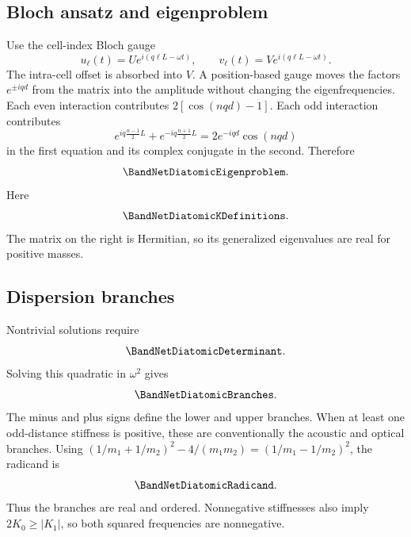 \subsection{Bloch ansatz and eigenproblem}

Use the cell-index Bloch gauge
\begin{equation}
    u_\ell(t)=Ue^{i(q\ell L-\omega t)},\qquad
    v_\ell(t)=Ve^{i(q\ell L-\omega t)}.
    \label{eq:bloch}
\end{equation}
The intra-cell offset is absorbed into $V$. A position-based gauge moves the
factors $e^{\pm iqd}$ from the matrix into the amplitude without changing the
eigenfrequencies. Each even interaction contributes
$2[\cos(nqd)-1]$. Each odd interaction contributes
\begin{equation*}
    e^{iq\frac{n-1}{2}L}+e^{-iq\frac{n+1}{2}L}
    =2e^{-iqd}\cos(nqd)
\end{equation*}
in the first equation and its complex conjugate in the second. Therefore
\begin{equation}
    \BandNetDiatomicEigenproblem.
    \label{eq:eigen}
\end{equation}
Here
\begin{equation}
    \BandNetDiatomicKDefinitions.
    \label{eq:dia-k}
\end{equation}
The matrix on the right is Hermitian, so its generalized eigenvalues are real
for positive masses.

\subsection{Dispersion branches}

Nontrivial solutions require
\begin{equation}
    \BandNetDiatomicDeterminant.
    \label{eq:determinant}
\end{equation}
Solving this quadratic in $\omega^2$ gives
\begin{equation}
    \BandNetDiatomicBranches.
    \label{eq:dia-branches}
\end{equation}
The minus and plus signs define the lower and upper branches. When at least one
odd-distance stiffness is positive, these are conventionally the acoustic and
optical branches. Using
$(1/m_1+1/m_2)^2-4/(m_1m_2)=(1/m_1-1/m_2)^2$, the radicand is
\begin{equation}
    \BandNetDiatomicRadicand.
    \label{eq:radicand}
\end{equation}
Thus the branches are real and ordered. Nonnegative stiffnesses also imply
$2K_0\geq|K_1|$, so both squared frequencies are nonnegative.

